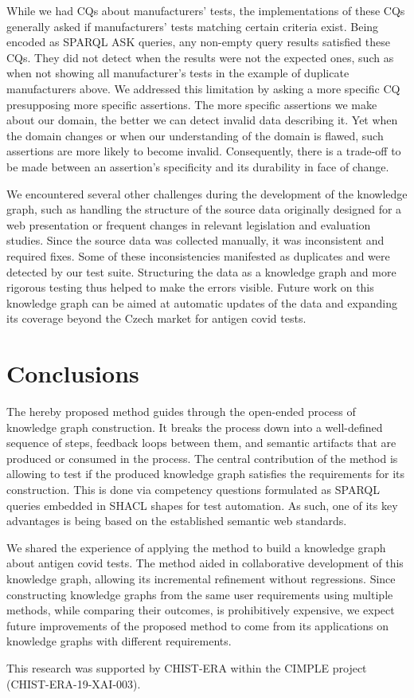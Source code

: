 \documentclass[
]{ceurart}
\begin{document}
While we had CQs about manufacturers' tests, the implementations of these CQs generally asked if manufacturers' tests matching certain criteria exist. Being encoded as SPARQL ASK queries, any non-empty query results satisfied these CQs. They did not detect when the results were not the expected ones, such as when not showing all manufacturer's tests in the example of duplicate manufacturers above. We addressed this limitation by asking a more specific CQ presupposing more specific assertions. The more specific assertions we make about our domain, the better we can detect invalid data describing it. Yet when the domain changes or when our understanding of the domain is flawed, such assertions are more likely to become invalid. Consequently, there is a trade-off to be made between an assertion's specificity and its durability in face of change.

We encountered several other challenges during the development of the knowledge graph, such as handling the structure of the source data originally designed for a web presentation or frequent changes in relevant legislation and evaluation studies. Since the source data was collected manually, it was inconsistent and required fixes. Some of these inconsistencies manifested as duplicates and were detected by our test suite. Structuring the data as a knowledge graph and more rigorous testing thus helped to make the errors visible. Future work on this knowledge graph can be aimed at automatic updates of the data and expanding its coverage beyond the Czech market for antigen covid tests.

\section{Conclusions}

The hereby proposed method guides through the open-ended process of knowledge graph construction. It breaks the process down into a well-defined sequence of steps, feedback loops between them, and semantic artifacts that are produced or consumed in the process. The central contribution of the method is allowing to test if the produced knowledge graph satisfies the requirements for its construction. This is done via competency questions formulated as SPARQL queries embedded in SHACL shapes for test automation. As such, one of its key advantages is being based on the established semantic web standards.

We shared the experience of applying the method to build a knowledge graph about antigen covid tests. The method aided in collaborative development of this knowledge graph, allowing its incremental refinement without regressions. Since constructing knowledge graphs from the same user requirements using multiple methods, while comparing their outcomes, is prohibitively expensive, we expect future improvements of the proposed method to come from its applications on knowledge graphs with different requirements.

\begin{acknowledgments}
  This research was supported by CHIST-ERA within the CIMPLE project (CHIST-ERA-19-XAI-003).
\end{acknowledgments}

\end{document}
